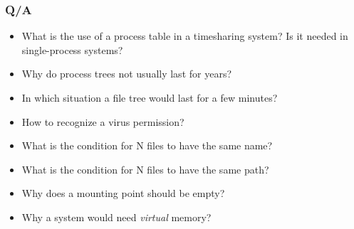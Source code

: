   \begin{frame}
    \frametitle{Q/A}
    \begin{itemize}
      \item What is the use of a process table in a timesharing system? Is it needed in single-process systems? %
      \item Why do process trees not usually last for years? %
      \item In which situation a file tree would last for a few minutes? %
      \item How to recognize a virus permission? %
      \item What is the condition for N files to have the same name? %
      \item What is the condition for N files to have the same path? %
      \item Why does a mounting point should be empty? %
      \item Why a system would need \emph{virtual} memory? %
    \end{itemize}
  \end{frame}
